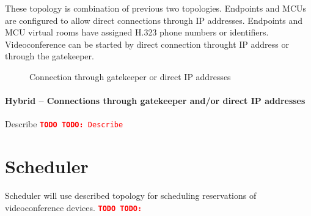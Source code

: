\documentclass[a4paper]{report}
\newcommand{\TODO}[1]{%
\def\empty{}%
\def\prvniparametr{#1}%
\ifx\prvniparametr\empty%
\begingroup\tt\textcolor{red}{\noindent\textbf{TODO}}\endgroup
\else%
\begingroup\tt\textcolor{red}{\noindent\textbf{TODO:}\ #1}\endgroup
\fi%
}
\newcommand{\graph}[4]{
\begin{figure}[h!]
\centering\scalebox{\ifx&#4& 0.75 \else #4 \fi}{}
\label{#1}
\caption{#3}
\end{figure}
}
\begin{document}
These topology is combination of previous two topologies. Endpoints and MCUs are configured to allow direct connections through IP addresses. Endpoints and MCU virtual rooms have assigned H.323 phone numbers or identifiers. Videoconference can be started by direct connection throught IP address or through the gatekeeper.

\graph{graph:h323:gatekeeper}{graph/h323_gatekeeper_or_direct.tex}{Connection through gatekeeper or direct IP addresses}{0.7}


\subsubsection{Hybrid -- Connections through gatekeeper and/or direct IP addresses}

\TODO{Describe}


\chapter{Scheduler}

Scheduler will use described topology for scheduling reservations of videoconference devices.
\TODO{}
\end{document}
